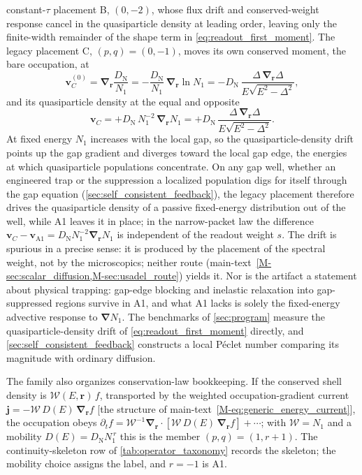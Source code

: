 \documentclass[
  aps,
  prb,
  preprint,
  superscriptaddress,
  longbibliography,
  nofootinbib
]{revtex4-2}
\newcommand{\br}{\mathbf{r}}
\newcommand{\bv}{\mathbf{v}}
\newcommand{\bnabla}{\boldsymbol{\nabla}}
\newcommand{\DOS}{N_1}
\newcommand{\DN}{D_{\mathrm{N}}}
\newcommand{\DE}{D(E)}
\begin{document}
constant-\(\tau\) placement B, \((0,-2)\), whose flux drift and
conserved-weight response cancel in the quasiparticle density at leading
order, leaving only the finite-width remainder of the shape term in
\cref{eq:readout_first_moment}. The legacy placement C,
\((p,q)=(0,-1)\), moves its own conserved moment, the bare occupation, at
\begin{equation}
  \bv_{C}^{(0)}
  =
  \bnabla_{\br}\frac{\DN}{\DOS}
  =
  -\frac{\DN}{\DOS}\,\bnabla_{\br}\ln\DOS
  =
  -\DN\,\frac{\Delta\,\bnabla_{\br}\Delta}{E\sqrt{E^{2}-\Delta^{2}}},
  \label{eq:legacy_drift_velocity}
\end{equation}
and its quasiparticle density at the equal and opposite
\begin{equation}
  \bv_{C}
  =
  +\DN\,\DOS^{-2}\,\bnabla_{\br}\DOS
  =
  +\DN\,\frac{\Delta\,\bnabla_{\br}\Delta}{E\sqrt{E^{2}-\Delta^{2}}}.
  \label{eq:legacy_density_drift}
\end{equation}
At fixed energy \(\DOS\) increases with the local gap, so the
quasiparticle-density drift points up the gap gradient and diverges
toward the local gap edge, the energies at which quasiparticle
populations concentrate. On any gap well, whether an engineered trap or
the suppression a localized population digs for itself through the gap
equation (\cref{sec:self_consistent_feedback}), the legacy placement
therefore drives the quasiparticle density of a passive fixed-energy
distribution out of the well, while A1 leaves it in place; in the
narrow-packet law the difference
\(\bv_{C}-\bv_{\mathrm{A1}}=\DN\DOS^{-2}\bnabla_{\br}\DOS\) is
independent of the readout weight \(s\).
The drift is spurious in a precise sense: it is produced by the
placement of the spectral weight, not by the microscopics; neither
route (main-text~\cref{M-sec:scalar_diffusion,M-sec:usadel_route}) yields it. Nor is
the artifact a statement about physical trapping: gap-edge blocking and
inelastic relaxation into gap-suppressed regions survive in A1, and
what A1 lacks is solely the fixed-energy advective response to
\(\bnabla\DOS\). The benchmarks of \cref{sec:program} measure the
quasiparticle-density drift of \cref{eq:readout_first_moment} directly,
and \cref{sec:self_consistent_feedback} constructs a
local P\'eclet number comparing its magnitude with ordinary diffusion.

The family also organizes conservation-law bookkeeping. If the conserved
shell density is \(\mathcal W(E,\br)\,f\), transported by the weighted
occupation-gradient current
\(\mathbf j=-\mathcal W\,\DE\,\bnabla_{\br}f\) [the structure of
main-text~\cref{M-eq:generic_energy_current}], the occupation obeys
\(\partial_tf=\mathcal W^{-1}\bnabla_{\br}\cdot[\mathcal W\,\DE\,\bnabla_{\br}f]+\cdots\);
with \(\mathcal W=\DOS\) and a mobility \(\DE=\DN\DOS^{\,r}\) this is the
member \((p,q)=(1,r+1)\). The continuity-skeleton row of
\cref{tab:operator_taxonomy} records the skeleton; the mobility choice
assigns the label, and \(r=-1\) is A1.
\end{document}
